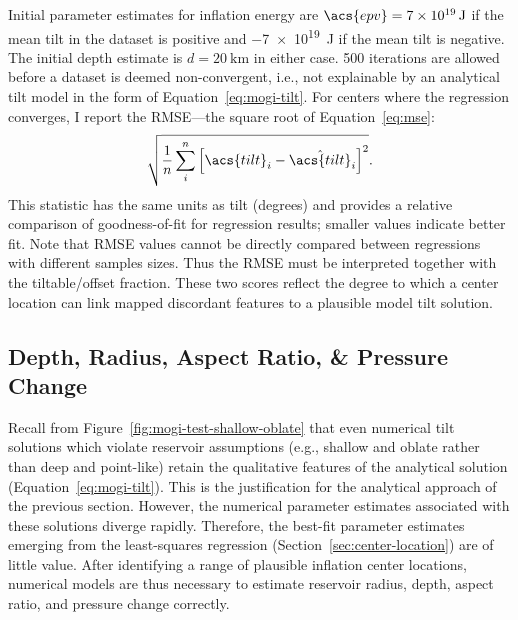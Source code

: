 Initial parameter estimates for inflation energy are $\acs{epv} = \qty{7e19}{\J}$ if the mean tilt in the dataset is positive and \qty{-7e19}{\J} if the mean tilt is negative. The initial depth estimate is $d = \qty{20}{\km}$ in either case. 500 iterations are allowed before a dataset is deemed non-convergent, i.e., not explainable by an analytical tilt model in the form of Equation~\eqref{eq:mogi-tilt}. For centers where the regression converges, I report the \ac{RMSE}---the square root of Equation~\eqref{eq:mse}:
\begin{equation}
    \sqrt{\frac{1}{n}\sum_{i}^{n}{\left[\acs{tilt}_i-\hat{\acs{tilt}}_i\right]}^2}.\label{eq:rmse}
\end{equation}
This statistic has the same units as \acs{tilt} (degrees) and provides a relative comparison of goodness-of-fit for regression results; smaller values indicate better fit. Note that \acs{RMSE} values cannot be directly compared between regressions with different samples sizes. Thus the \acs{RMSE} must be interpreted together with the tiltable/offset fraction. These two scores reflect the degree to which a center location can link mapped discordant features to a plausible model tilt solution.

\subsection{Depth, Radius, Aspect Ratio, \& Pressure Change}

Recall from Figure~\ref{fig:mogi-test-shallow-oblate} that even numerical tilt solutions which violate \textcite{mogi_relations_1958} reservoir assumptions (e.g., shallow and oblate rather than deep and point-like) retain the qualitative features of the analytical solution (Equation~\ref{eq:mogi-tilt}). This is the justification for the analytical approach of the previous section. However, the numerical parameter estimates associated with these solutions diverge rapidly. Therefore, the best-fit parameter estimates emerging from the least-squares regression (Section~\ref{sec:center-location}) are of little value. After identifying a range of plausible inflation center locations, numerical models are thus necessary to estimate reservoir radius, depth, aspect ratio, and pressure change correctly.

